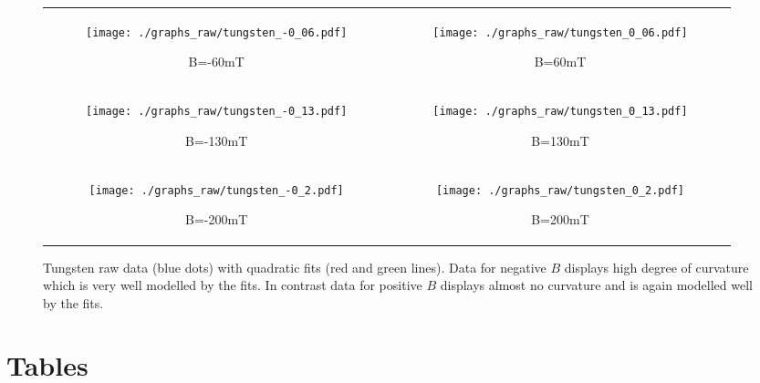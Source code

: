 \documentclass[a4paper]{article}
\begin{document}
	\begin{figure}[h]
		\centering
		\begin{tabular}{c|c}
			\begin{subfigure}[t]{0.45\textwidth}
				\centering
				\texttt{[image: ./graphs\_raw/tungsten\_-0\_06.pdf]}
				\caption{B=-60mT}
				\label{fig:tungstenRawGraph-60mT}
			\end{subfigure}
			&
			\begin{subfigure}[t]{0.45\textwidth}
				\centering
				\texttt{[image: ./graphs\_raw/tungsten\_0\_06.pdf]}
				\caption{B=60mT}
				\label{fig:tungstenRawGraph60mT}
			\end{subfigure}
			\\
			\begin{subfigure}[t]{0.45\textwidth}
				\centering
				\texttt{[image: ./graphs\_raw/tungsten\_-0\_13.pdf]}
				\caption{B=-130mT}
				\label{fig:tungstenRawGraph-130mT}
			\end{subfigure}
			&
			\begin{subfigure}[t]{0.45\textwidth}
				\centering
				\texttt{[image: ./graphs\_raw/tungsten\_0\_13.pdf]}
				\caption{B=130mT}
				\label{fig:tungstenRawGraph130mT}
			\end{subfigure}
			\\
			\begin{subfigure}[t]{0.45\textwidth}
				\centering
				\texttt{[image: ./graphs\_raw/tungsten\_-0\_2.pdf]}
				\caption{B=-200mT}
				\label{fig:tungstenRawGraph-200mT}
			\end{subfigure}
			&
			\begin{subfigure}[t]{0.45\textwidth}
				\centering
				\texttt{[image: ./graphs\_raw/tungsten\_0\_2.pdf]}
				\caption{B=200mT}
				\label{fig:tungstenRawGraph200mT}
			\end{subfigure}
		\end{tabular}
		\caption{Tungsten raw data (blue dots) with quadratic fits (red and green lines). Data for negative $B$ displays high degree of curvature which is very well modelled by the fits. In contrast data for positive $B$ displays almost no curvature and is again modelled well by the fits.}
		\label{fig:tunstenRawGraphs}
	\end{figure}
	
	\clearpage
	\newpage
	\section{Tables} \label{sec:tables}
	
\end{document}

